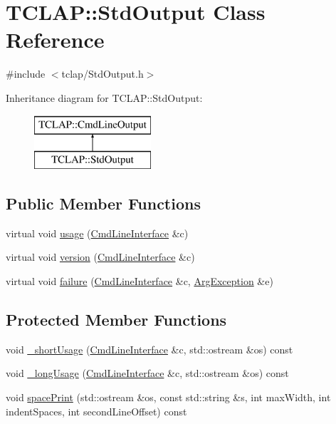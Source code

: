 \hypertarget{class_t_c_l_a_p_1_1_std_output}{}\section{T\+C\+L\+A\+P\+:\+:Std\+Output Class Reference}
\label{class_t_c_l_a_p_1_1_std_output}


{\ttfamily \#include $<$tclap/\+Std\+Output.\+h$>$}

Inheritance diagram for T\+C\+L\+A\+P\+:\+:Std\+Output\+:\begin{figure}[H]
\begin{center}
\leavevmode
\includegraphics[height=2.000000cm]{class_t_c_l_a_p_1_1_std_output}
\end{center}
\end{figure}
\subsection*{Public Member Functions}
\begin{DoxyCompactItemize}
\item 
virtual void \hyperlink{class_t_c_l_a_p_1_1_std_output_aeb10eb400e0ee45f2cde689bef606b49}{usage} (\hyperlink{class_t_c_l_a_p_1_1_cmd_line_interface}{Cmd\+Line\+Interface} \&c)
\item 
virtual void \hyperlink{class_t_c_l_a_p_1_1_std_output_a768111a59af4753ac6e5ace3ec99482e}{version} (\hyperlink{class_t_c_l_a_p_1_1_cmd_line_interface}{Cmd\+Line\+Interface} \&c)
\item 
virtual void \hyperlink{class_t_c_l_a_p_1_1_std_output_a9afc267e012c3ac42c8b1afe01f98556}{failure} (\hyperlink{class_t_c_l_a_p_1_1_cmd_line_interface}{Cmd\+Line\+Interface} \&c, \hyperlink{class_t_c_l_a_p_1_1_arg_exception}{Arg\+Exception} \&e)
\end{DoxyCompactItemize}
\subsection*{Protected Member Functions}
\begin{DoxyCompactItemize}
\item 
void \hyperlink{class_t_c_l_a_p_1_1_std_output_a60fa57587838d506d907f08800f2631c}{\+\_\+short\+Usage} (\hyperlink{class_t_c_l_a_p_1_1_cmd_line_interface}{Cmd\+Line\+Interface} \&c, std\+::ostream \&os) const 
\item 
void \hyperlink{class_t_c_l_a_p_1_1_std_output_ace725aebd685c16f464d697e85e0327d}{\+\_\+long\+Usage} (\hyperlink{class_t_c_l_a_p_1_1_cmd_line_interface}{Cmd\+Line\+Interface} \&c, std\+::ostream \&os) const 
\item 
void \hyperlink{class_t_c_l_a_p_1_1_std_output_a38661be8895e07c442c2c3138b7444a2}{space\+Print} (std\+::ostream \&os, const std\+::string \&s, int max\+Width, int indent\+Spaces, int second\+Line\+Offset) const 
\end{DoxyCompactItemize}


